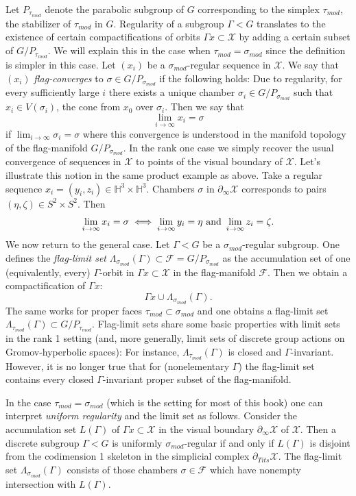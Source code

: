 \documentclass[12pt]{amsbook}%
\theoremstyle{definition}
\theoremstyle{remark}
\numberwithin{section}{chapter}
\numberwithin{subsection}{section}
\numberwithin{figure}{chapter}
\def\tits{\partial_{Tits}}
\def\taumod{\tau_{mod}}
\def\simod{\sigma_{mod}}
\def\bH{{\mathbb{H}}}
\def\cF{{\mathscr{F}}}
\def\cX{{\mathscr{X}}}
\def\Ga{\Gamma}
\def\La{\Lambda}
\def\geo{\partial_\infty}
\def\kap{}
\begin{document}
{{Let $P_{\taumod}$ denote the parabolic subgroup of $G$ corresponding to the simplex $\taumod$, the stabilizer of $\taumod$ in $G$. 
Regularity of a subgroup $\Ga< G$ translates to the existence of certain compactifications of orbits $\Ga x\subset \cX$ by adding a certain subset of $G/P_{\taumod}$. We will explain this 
in the case when $\taumod=\simod$ since the definition is simpler in this case. Let $(x_i)$ be a $\simod$-regular sequence in $\cX$. 
We say that $(x_i)$ {\em flag-converges} to $\sigma\in G/P_{\simod}$ if the following holds: Due to regularity, for every sufficiently large $i$ there exists a unique chamber $\sigma_i\in  
G/P_{\simod}$ such that $x_i\in V(\sigma_i)$, the cone from $x_0$ over $\sigma_i$. Then we say that
$$
\lim_{i\to\infty} x_i=\sigma
$$
if $\lim_{i\to\infty} \sigma_i=\sigma$ where this convergence is understood in the manifold topology of the flag-manifold $G/P_{\simod}$. In the rank one case we 
simply recover the usual convergence of sequences in $\cX$ to points of the visual boundary of $\cX$. Let's illustrate this notion in the same product example as above. Take a regular sequence $x_i=(y_i,z_i)\in \bH^3\times \bH^3$. Chambers $\sigma$ in $\geo \cX$ corresponds to pairs $(\eta, \zeta)\in S^2\times S^2$. Then 
$$
\lim_{i\to\infty} x_i=\sigma \iff \lim_{i\to\infty} y_i=\eta \hbox{~and~}  \lim_{i\to\infty} z_i=\zeta. 
$$
We now return to the general case. Let $\Ga< G$ be a $\simod$-regular subgroup. One defines the {\em flag-limit set} 
$\La_{\simod}(\Ga)\subset \cF= G/P_{\simod}$ as the accumulation set of one (equivalently, every) $\Ga$-orbit in $\Ga x\subset \cX$ in the flag-manifold 
$\cF$. Then we obtain a compactification of $\Ga x$:
$$
\Ga x\cup \La_{\simod}(\Ga). 
$$
The same works for proper faces $\taumod\subset \simod$ and one obtains a flag-limit set $\La_{\taumod}(\Ga)\subset G/P_{\taumod}$. 
Flag-limit sets share some basic properties with limit sets in the rank 1 setting (and, more generally, limit sets of discrete group actions on 
Gromov-hyperbolic spaces): For instance, $\La_{\taumod}(\Ga)$ is closed and $\Ga$-invariant. However, it is no longer true that for (nonelementary $\Ga$) the flag-limit set contains every closed $\Ga$-invariant proper subset of the flag-manifold. 



In the case $\taumod=\simod$ (which is the setting for most of this book) 
one can interpret {\em uniform regularity} and the limit set as follows. Consider the accumulation set 
$L(\Ga)$ of $\Ga x\subset \cX$ in the visual boundary $\geo \cX$ of $\cX$. Then a discrete subgroup $\Ga< G$ is uniformly $\simod$-regular if and only if 
$L(\Ga)$ is disjoint from the codimension 1 skeleton in the simplicial complex $\tits \cX$. The flag-limit set 
$\La_{\simod}(\Ga)$ consists of those chambers $\sigma\in \cF$ which have nonempty intersection with $L(\Ga)$.  


}}
\end{document}

